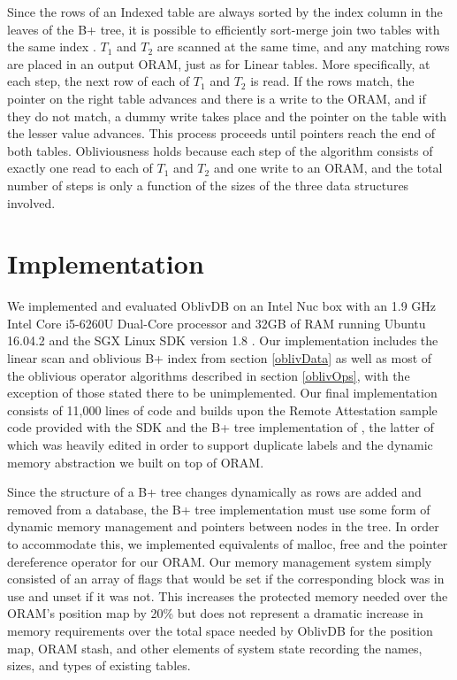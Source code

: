 \documentclass[USenglish,oneside,twocolumn]{article}
\def\name/{OblivDB}
\begin{document}
Since the rows of an Indexed table are always sorted by the index column in the leaves of the B+ tree, it is possible to efficiently sort-merge join two tables with the same index \cite{EN10}. $T_1$ and $T_2$ are scanned at the same time, and any matching rows are placed in an output ORAM, just as for Linear tables. More specifically, at each step, the next row of each of $T_1$ and $T_2$ is read. If the rows match, the pointer on the right table advances and there is a write to the ORAM, and if they do not match, a dummy write takes place and the pointer on the table with the lesser value advances. This process proceeds until pointers reach the end of both tables. Obliviousness holds because each step of the algorithm consists of exactly one read to each of $T_1$ and $T_2$ and one write to an ORAM, and the total number of steps is only a function of the sizes of the three data structures involved.  

\section{Implementation}\label{imp}
We implemented and evaluated \name/ on an Intel Nuc box with an 1.9 GHz Intel Core i5-6260U Dual-Core processor and 32GB of RAM running Ubuntu 16.04.2 and the SGX Linux SDK version 1.8 \cite{SGXRef}. Our implementation includes the linear scan and oblivious B+ index from section \ref{oblivData} as well as most of the oblivious operator algorithms described in section \ref{oblivOps}, with the exception of those stated there to be unimplemented. Our final implementation consists of 11,000 lines of code and builds upon the Remote Attestation sample code provided with the SDK and the B+ tree implementation of \cite{BPlus}, the latter of which was heavily edited in order to support duplicate labels and the dynamic memory abstraction we built on top of ORAM. 

Since the structure of a B+ tree changes dynamically as rows are added and removed from a database, the B+ tree implementation must use some form of dynamic memory management and pointers between nodes in the tree. In order to accommodate this, we implemented equivalents of malloc, free and the pointer dereference operator for our ORAM. Our memory management system simply consisted of an array of flags that would be set if the corresponding block was in use and unset if it was not. This increases the protected memory needed over the ORAM's position map by 20\% but does not represent a dramatic increase in memory requirements over the total space needed by \name/ for the position map, ORAM stash, and other elements of system state recording the names, sizes, and types of existing tables. 
\end{document}
